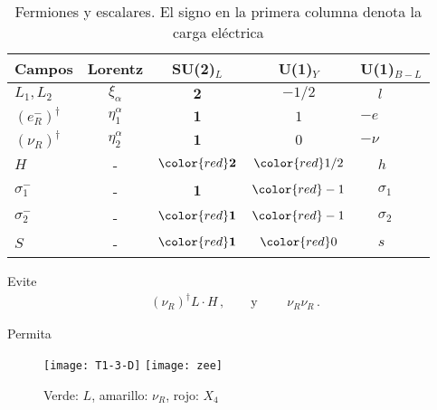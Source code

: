 \begin{frame}

\begin{table}
  \centering
    \begin{tabular}{|l|c|c|c|l|}\hline
    Campos &Lorentz& SU(2)$_{L}$ & U(1)$_Y$ & U(1)$_{B-L}$\\\hline
    $L_1,L_2$ & $\xi_{\alpha}$& $\mathbf{2}$ & $-1/2$&$\phantom{-}l$\\
    $\left(e_R^{-}\right)^{\dagger}$ & $\eta_1^\alpha$& $\mathbf{1}$ & $1$&$-e$\\
    $\left(\nu_R\right)^{\dagger}$ &$\eta_2^\alpha$ & $\mathbf{1}$ & $0$&$-\nu$\\
     $H$  &-&$\color{red}\mathbf{2}$&$\color{red}1/2$&$\phantom{-}h$\\
     $\sigma_1^-$ &-&$\mathbf{1}$&$\color{red}-1$&$\phantom{-}\sigma_1$\\
     $\sigma_2^-$ &-&$\color{red}\mathbf{1}$&$\color{red}-1$&$\phantom{-}\sigma_2$\\
     $S$ &-&$\color{red}\mathbf{1}$&${\color{red}0}$&$\phantom{-}s$\\\hline
  \end{tabular}\hspace{1cm} 
  \caption{Fermiones y escalares. El signo en la primera columna denota la carga eléctrica }
  \label{tab:fs}
\end{table}


Evite
\begin{align}
  \left( \nu_R \right)^{\dagger} L\cdot H\,,\qquad\text{y }\qquad \nu_R \nu_R\,.
\end{align}
\end{frame}

\begin{frame}
Permita


\begin{figure}
  \centering
  \texttt{[image: T1-3-D]} \hspace{1cm}
  \texttt{[image: zee]}
  \caption{Verde: $L$, amarillo: $\nu_R$, rojo: $X_4$  }
  \label{fig:gg}
\end{figure}
\end{frame}

